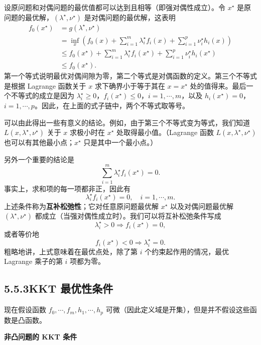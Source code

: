 \documentclass[UTF8, 12pt, fontset=fandol, oneside]{ctexart}
\begin{document}
设原问题和对偶问题的最优值都可以达到且相等（即强对偶性成立）。令 $x^\star$ 是原问题的最优解，$(\lambda^\star,\nu^\star)$ 是对偶问题的最优解，这表明
\[
\begin{aligned}
f_0(x^\star)
&=g(\lambda^\star,\nu^\star)\\
&=\inf_x\left(f_0(x)+\sum_{i=1}^m\lambda_i^\star f_i(x)+\sum_{i=1}^p\nu_i^\star h_i(x)\right)\\
&\leq f_0(x^\star)+\sum_{i=1}^m\lambda_i^\star f_i(x^\star)+\sum_{i=1}^p\nu_i^\star h_i(x^\star)\\
&\leq f_0(x^\star).
\end{aligned}
\]
第一个等式说明最优对偶间隙为零，第二个等式是对偶函数的定义。第三个不等式是根据 Lagrange 函数关于 $x$ 求下确界小于等于其在 $x=x^\star$ 处的值得来。最后一个不等式的成立是因为 $\lambda_i^\star\geq 0$，$f_i(x^\star)\leq 0$，$i=1,\cdots,m$，以及 $h_i(x^\star)=0$，$i=1,\cdots,p$。因此，在上面的式子链中，两个不等式取等号。

可以由此得出一些有意义的结论。例如，由于第三个不等式变为等式，我们知道 $L(x,\lambda^\star,\nu^\star)$ 关于 $x$ 求极小时在 $x^\star$ 处取得最小值。（Lagrange 函数 $L(x,\lambda^\star,\nu^\star)$ 也可以有其他最小点；$x^\star$ 只是其中一个最小点。）

另外一个重要的结论是
\[
\sum_{i=1}^m\lambda_i^\star f_i(x^\star)=0.
\]
事实上，求和项的每一项都非正，因此有
\begin{equation}
\lambda_i^\star f_i(x^\star)=0,\quad i=1,\cdots,m.
\tag{5.48}
\end{equation}
上述条件称为\textbf{互补松弛性}；它对任意原问题最优解 $x^\star$ 以及对偶问题最优解 $(\lambda^\star,\nu^\star)$ 都成立（当强对偶性成立时）。我们可以将互补松弛条件写成
\[
\lambda_i^\star>0\Longrightarrow f_i(x^\star)=0,
\]
或者等价地
\[
f_i(x^\star)<0\Longrightarrow \lambda_i^\star=0.
\]
粗略地讲，上式意味着在最优点处，除了第 $i$ 个约束起作用的情况，最优 Lagrange 乘子的第 $i$ 项都为零。

\subsection*{5.5.3\quad KKT 最优性条件}

现在假设函数 $f_0,\cdots,f_m,h_1,\cdots,h_p$ 可微（因此定义域是开集），但是并不假设这些函数是凸函数。

\noindent\textbf{非凸问题的 KKT 条件}
\end{document}
